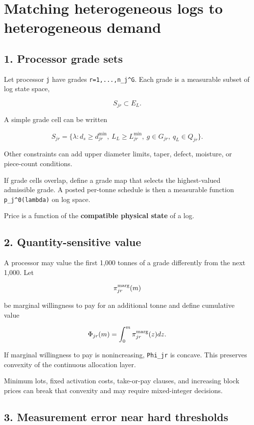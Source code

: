 \section{Matching heterogeneous logs to heterogeneous demand}\label{matching-heterogeneous-logs-to-heterogeneous-demand}

\subsection{1. Processor grade sets}\label{processor-grade-sets}

Let processor \texttt{j} have grades \texttt{r=1,...,n\_j\^{}G}. Each grade is a measurable subset
of log state space,

\[
S_{jr}\subset E_L.
\]

A simple grade cell can be written

\[
S_{jr}=\{\lambda:d_s\ge d_{jr}^{\min},\ L_L\ge L_{jr}^{\min},
\ g\in G_{jr},\ q_L\in Q_{jr}\}.
\]

Other constraints can add upper diameter limits, taper, defect, moisture, or
piece-count conditions.

If grade cells overlap, define a grade map that selects the highest-valued
admissible grade. A posted per-tonne schedule is then a measurable function
\texttt{p\_j\^{}0(lambda)} on log space.

Price is a function of the \textbf{compatible physical state} of a log.

\subsection{2. Quantity-sensitive value}\label{quantity-sensitive-value}

A processor may value the first 1,000 tonnes of a grade differently from the
next 1,000. Let

\[
\pi_{jr}^{\rm marg}(m)
\]

be marginal willingness to pay for an additional tonne and define cumulative
value

\[
\Phi_{jr}(m)=\int_0^m\pi_{jr}^{\rm marg}(z)dz.
\]

If marginal willingness to pay is nonincreasing, \texttt{Phi\_jr} is concave. This
preserves convexity of the continuous allocation layer.

Minimum lots, fixed activation costs, take-or-pay clauses, and increasing block
prices can break that convexity and may require mixed-integer decisions.

\subsection{3. Measurement error near hard thresholds}\label{measurement-error-near-hard-thresholds}

